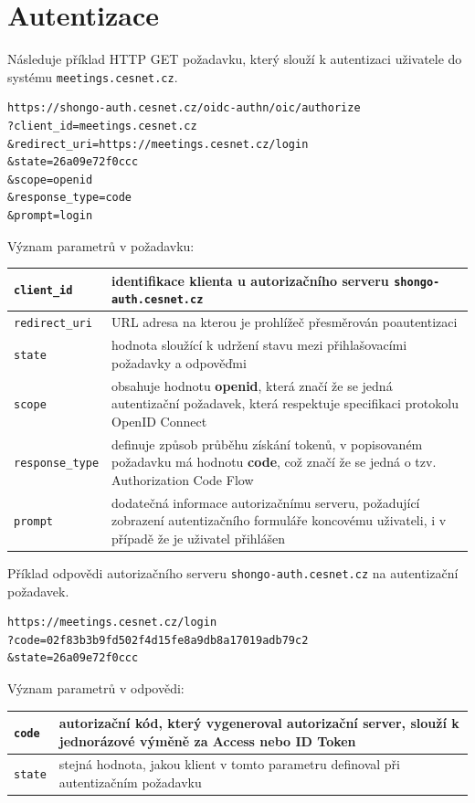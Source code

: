 \documentclass[
  printed, %
  twoside, %
  table,   %
  nolof,     %
  nolot,     %
]{fithesis3}
\begin{document}
\section{Autentizace}
Následuje příklad HTTP GET požadavku, který slouží k autentizaci uživatele do systému \texttt{meetings.cesnet.cz}.
\begin{lstlisting}
https://shongo-auth.cesnet.cz/oidc-authn/oic/authorize
?client_id=meetings.cesnet.cz
&redirect_uri=https://meetings.cesnet.cz/login
&state=26a09e72f0ccc
&scope=openid
&response_type=code
&prompt=login
\end{lstlisting}
\noindent
Význam parametrů v požadavku:
\label{table:autentizace:req}
\begin{table}[H]
\begin{tabular}{|l|l|}
\hline
\texttt{client\_id}                             & \parbox[t]{9cm}{identifikace klienta u autorizačního serveru \texttt{shongo-auth.cesnet.cz}}  \\ \hline
\texttt{redirect\_uri}                          & \parbox[t]{9cm}{URL adresa na kterou je prohlížeč přesměrován poautentizaci}  \\ \hline
\texttt{state}                                  & \parbox[t]{9cm}{hodnota sloužící k udržení stavu mezi přihlašovacími požadavky a odpověďmi}  \\ \hline
\texttt{scope}                                  & \parbox[t]{9cm}{obsahuje hodnotu \textbf{openid}, která značí že se jedná autentizační požadavek, která respektuje specifikaci protokolu OpenID Connect}  \\ \hline
\texttt{response\_type}                         & \parbox[t]{9cm}{definuje způsob průběhu získání tokenů, v popisovaném požadavku má hodnotu \textbf{code}, což značí že se jedná o tzv. Authorization Code Flow}  \\ \hline
\texttt{prompt}                                 & \parbox[t]{9cm}{dodatečná informace autorizačnímu serveru, požadující zobrazení autentizačního formuláře koncovému uživateli, i v případě že je uživatel přihlášen}  \\ \hline

\end{tabular}
\end{table}

\noindent
Příklad odpovědi autorizačního serveru \texttt{shongo-auth.cesnet.cz} na autentizační požadavek.
\begin{lstlisting}
https://meetings.cesnet.cz/login
?code=02f83b3b9fd502f4d15fe8a9db8a17019adb79c2
&state=26a09e72f0ccc
\end{lstlisting}
\noindent
Význam parametrů v odpovědi:
\label{table:autentizace}
\begin{table}[H]
\begin{tabular}{|l|l|}
\hline
\texttt{code}   & \parbox[t]{10.8cm}{autorizační kód, který vygeneroval autorizační server, slouží k jednorázové výměně za Access nebo ID Token}  \\ \hline
\texttt{state}  & \parbox[t]{10.8cm}{stejná hodnota, jakou klient v tomto parametru definoval při autentizačním požadavku}  \\ \hline
\end{tabular}
\end{table}
\clearpage
\end{document}
